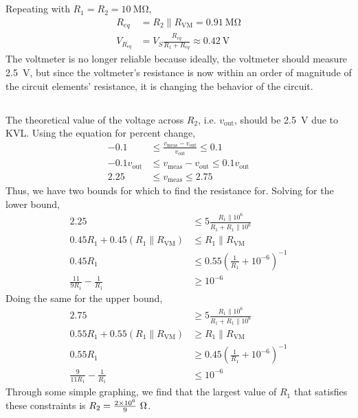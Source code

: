 \documentclass[]{article}
\begin{document}
\subsection{}

Repeating with \(R_1 = R_2 = \SI{10}{\mega\ohm}\), 
\begin{align}
	R_{eq} &= R_2 \parallel R_{\text{VM}} = \SI{0.91}{\mega\ohm} \\
	V_{R_{eq}} &= V_S \frac{R_{eq}}{R_1 + R_{eq}} \approx \SI{0.42}{\volt}
\end{align}
The voltmeter is no longer reliable because ideally, the voltmeter should measure \SI{2.5}{\volt}, but since the voltmeter's resistance is now within an order of magnitude of the circuit elements' resistance, it is changing the behavior of the circuit. 

\subsection{}

The theoretical value of the voltage across \(R_2\), i.e. \(v_{\text{out}}\), should be \SI{2.5}{\volt} due to KVL. 
Using the equation for percent change, 
\begin{align}
	-0.1 &\le \frac{v_{\text{meas}} - v_{\text{out}}}{v_{\text{out}}} \le 0.1 \\
	-0.1 v_{\text{out}} &\le v_{\text{meas}} - v_{\text{out}} \le 0.1 v_{\text{out}} \\
	2.25 &\le v_{\text{meas}} \le 2.75
\end{align}
Thus, we have two bounds for which to find the resistance for. Solving for the lower bound, 
\begin{align}
	2.25 &\le 5 \frac{R_{1} \parallel 10^6}{R_1 + R_{1} \parallel 10^6} \\
	0.45R_1 + 0.45 (R_{1} \parallel R_{\text{VM}}) &\le R_{1} \parallel R_{\text{VM}} \\
	0.45R_1 &\le 0.55\left(\frac{1}{R_1} + 10^{-6}\right)^{-1} \\
	\frac{11}{9R_1} - \frac{1}{R_1} &\ge 10^{-6}
\end{align}
Doing the same for the upper bound, 
\begin{align}
	2.75 &\ge 5 \frac{R_{1} \parallel 10^6}{R_1 + R_{1} \parallel 10^6} \\
	0.55R_1 + 0.55 (R_{1} \parallel R_{\text{VM}}) &\ge R_{1} \parallel R_{\text{VM}} \\
	0.55R_1 &\ge 0.45\left(\frac{1}{R_1} + 10^{-6}\right)^{-1} \\
	\frac{9}{11R_1} - \frac{1}{R_1} &\le 10^{-6}
\end{align}
Through some simple graphing, we find that the largest value of \(R_1\) that satisfies these constraints is \(R_2 = \frac{\num{2d6}}{9} \ \si{\ohm}\). 
\end{document}
